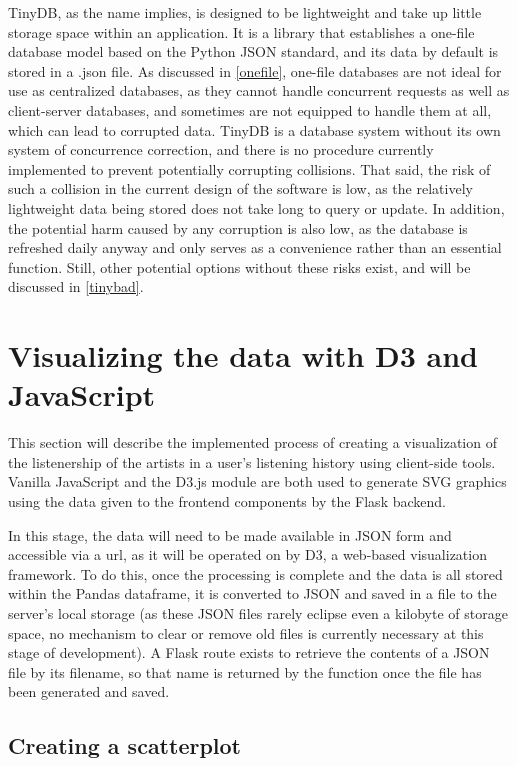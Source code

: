 TinyDB, as the name implies, is designed to be lightweight and take up little storage space within an application. It is a library that establishes a one-file database model based on the Python JSON standard, and its data by default is stored in a .json file. As discussed in \autoref{onefile}, one-file databases are not ideal for use as centralized databases, as they cannot handle concurrent requests as well as client-server databases, and sometimes are not equipped to handle them at all, which can lead to corrupted data. TinyDB is a database system without its own system of concurrence correction, and there is no procedure currently implemented to prevent potentially corrupting collisions. That said, the risk of such a collision in the current design of the software is low, as the relatively lightweight data being stored does not take long to query or update. In addition, the potential harm caused by any corruption is also low, as the database is refreshed daily anyway and only serves as a convenience rather than an essential function. Still, other potential options without these risks exist, and will be discussed in \autoref{tinybad}.

\section{Visualizing the data with D3 and JavaScript}

This section will describe the implemented process of creating a visualization of the listenership of the artists in a user's listening history using client-side tools. Vanilla JavaScript and the D3.js module are both used to generate SVG graphics using the data given to the frontend components by the Flask backend.

In this stage, the data will need to be made available in JSON form and accessible via a url, as it will be operated on by D3, a web-based visualization framework. To do this, once the processing is complete and the data is all stored within the Pandas dataframe, it is converted to JSON and saved in a file to the server's local storage (as these JSON files rarely eclipse even a kilobyte of storage space, no mechanism to clear or remove old files is currently necessary at this stage of development). A Flask route exists to retrieve the contents of a JSON file by its filename, so that name is returned by the function once the file has been generated and saved.

\subsection{Creating a scatterplot}

